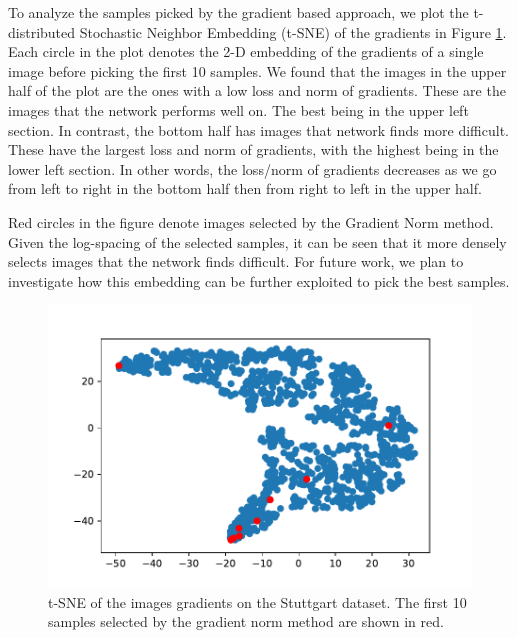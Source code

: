 \documentclass[letterpaper, 10 pt, conference]{ieeeconf}  %
\begin{document}
   
   To analyze the samples picked by the gradient based approach, we plot the t-distributed Stochastic Neighbor Embedding (t-SNE) of the gradients in Figure \ref{fig:tsne}. Each circle in the plot denotes the 2-D embedding of the gradients of a single image before picking the first 10 samples. We found that the images in the upper half of the plot are the ones with a low loss and norm of gradients. These are the images that the network performs well on. The best being in the upper left section. In contrast, the bottom half has images that network finds more difficult. These have the largest loss and norm of gradients, with the highest being in the lower left section. In other words, the loss/norm of gradients decreases as we go from left to right in the bottom half then from right to left in the upper half.  
   
Red circles in the figure denote images selected by the Gradient Norm method. Given the log-spacing of the selected samples, it can be seen that it more densely selects images that the network finds difficult. For future work, we plan to investigate how this embedding can be further exploited to pick the best samples.
   
       \begin{figure}
    \centering
    \includegraphics[width=\linewidth]{pics/tsne_grad_norm.pdf}
   		\caption{t-SNE of the images gradients on the Stuttgart dataset. The first 10 samples selected by the gradient norm method are shown in red.}
		\label{fig:tsne}    		
   \end{figure}
\end{document}
